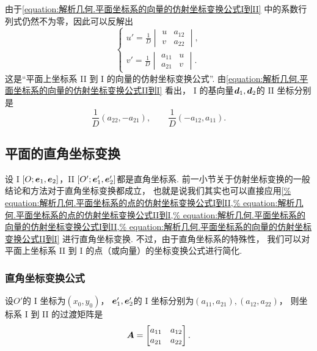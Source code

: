由于\cref{equation:解析几何.平面坐标系的向量的仿射坐标变换公式I到II}
中的系数行列式仍然不为零，因此可以反解出
\begin{equation}\label{equation:解析几何.平面坐标系的向量的仿射坐标变换公式II到I}
	\left\{ \begin{array}{l}
		u' = \frac{1}{D} \begin{vmatrix}
			u & a_{12} \\
			v & a_{22}
		\end{vmatrix}, \\
		v' = \frac{1}{D} \begin{vmatrix}
			a_{11} & u \\
			a_{21} & v
		\end{vmatrix}.
	\end{array} \right.
\end{equation}
这是“平面上坐标系 II 到 I 的向量的仿射坐标变换公式”.
由\cref{equation:解析几何.平面坐标系的向量的仿射坐标变换公式II到I} 看出，
I 的基向量\(\boldsymbol{d}_1,\boldsymbol{d}_2\)的 II 坐标分别是\[
	\frac{1}{D} (a_{22},-a_{21}), \qquad
	\frac{1}{D} (-a_{12},a_{11}).
\]

\subsection{平面的直角坐标变换}
设 I \([O;\boldsymbol{e}_1,\boldsymbol{e}_2]\)，II \([O';\boldsymbol{e}_1',\boldsymbol{e}_2']\)都是直角坐标系.
前一小节关于仿射坐标变换的一般结论和方法对于直角坐标变换都成立，
也就是说我们其实也可以直接应用\cref{%
equation:解析几何.平面坐标系的点的仿射坐标变换公式I到II,%
equation:解析几何.平面坐标系的点的仿射坐标变换公式II到I,%
equation:解析几何.平面坐标系的向量的仿射坐标变换公式I到II,%
equation:解析几何.平面坐标系的向量的仿射坐标变换公式II到I}
进行直角坐标变换.
不过，由于直角坐标系的特殊性，
我们可以对平面上坐标系 II 到 I 的点（或向量）的坐标变换公式进行简化.

\subsubsection{直角坐标变换公式}
设\(O'\)的 I 坐标为\((x_0,y_0)\)，
\(\boldsymbol{e}_1',\boldsymbol{e}_2'\)的 I 坐标分别为\((a_{11},a_{21}),(a_{12},a_{22})\)，
则坐标系 I 到 II 的过渡矩阵是\[
	\boldsymbol{A} = \begin{bmatrix}
		a_{11} & a_{12} \\
		a_{21} & a_{22}
	\end{bmatrix}.
\]

